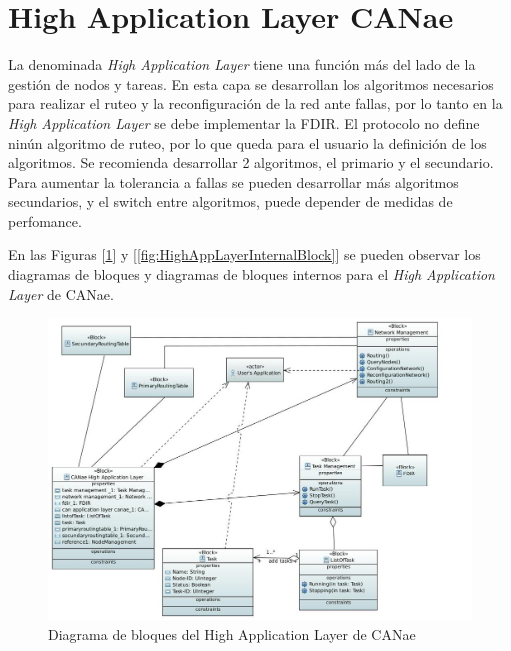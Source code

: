 \section{High Application Layer CANae}
La denominada \textit{High Application Layer} tiene una función más del lado de
la gestión de nodos y tareas. En esta capa se desarrollan los algoritmos
necesarios para realizar el ruteo y la reconfiguración de la red ante fallas,
por lo tanto en la \textit{High Application Layer} se debe implementar la
\ac{FDIR}. El protocolo no define ninún algoritmo de ruteo, por lo que queda
para el usuario la definición de los algoritmos. Se recomienda desarrollar 2
algoritmos, el primario y el secundario. Para aumentar la tolerancia a fallas
se pueden desarrollar más algoritmos secundarios, y el switch entre algoritmos,
puede depender de medidas de perfomance.

En las Figuras [\ref{fig:HighAppLayerBlock}] y
[\ref{fig:HighAppLayerInternalBlock}] se pueden observar los diagramas de
bloques y diagramas de bloques internos para el \textit{High Application
Layer} de CANae. 

\begin{figure}[h!]
 \centering
 \includegraphics[scale=0.4]{images/Secciones/AppendixA/CANae_High_App_Layer.JPG}
  \caption{Diagrama de bloques del High Application Layer de CANae}
\label{fig:HighAppLayerBlock}
\end{figure}

